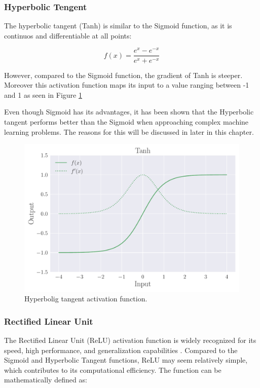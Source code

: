 \documentclass[a4paper, UKenglish, 11pt]{uiomaster}
\begin{document}
\subsubsection{Hyperbolic Tengent}
The hyperbolic tangent (Tanh) is similar to the Sigmoid function, as it is continuos and differentiable at all points:

\begin{equation}
  f(x) = \frac{{e^x - e^{-x}}}{{e^x + e^{-x}}}
\label{eq:I}
\end{equation}

However, compared to the Sigmoid function, the gradient of Tanh is steeper. Moreover this activation function maps its input to a value ranging between -1 and 1 as seen in Figure \ref{fig:Tanh}

Even though Sigmoid has its advantages, it has been shown that the Hyperbolic tangent performs better than the Sigmoid when approaching complex machine learning problems. The reasons for this will be discussed in later in this chapter.

\begin{figure}
    \centering
    \includegraphics[width=\linewidth]{figures/Tanh.pdf}
    \caption{Hyperbolig tangent activation function.}
    \label{fig:Tanh}
\end{figure}

\subsubsection{Rectified Linear Unit}
The Rectified Linear Unit (ReLU) activation function is widely recognized for its speed, high performance, and generalization capabilities \cite{wandb_activation_functions}. Compared to the Sigmoid and Hyperbolic Tangent functions, ReLU may seem relatively simple, which contributes to its computational efficiency. The function can be mathematically defined as:
\end{document}
